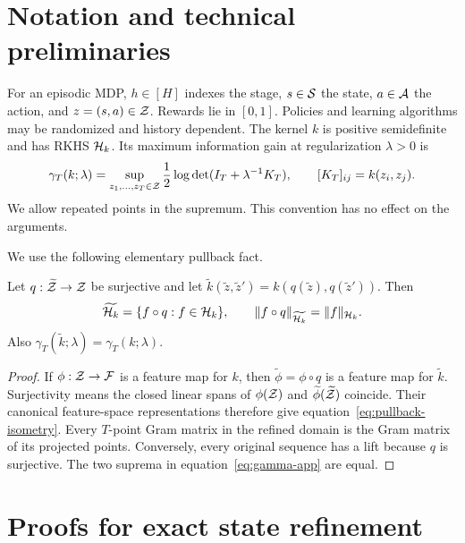 \section{Notation and technical preliminaries}
\label{app:prelim}

For an episodic MDP, $h\in[H]$ indexes the stage, $s\in\mathcal S$ the state,
$a\in\mathcal A$ the action, and $z=(s,a)\in\mathcal Z$. Rewards lie in $[0,1]$.
Policies and learning algorithms may be randomized and history dependent. The
kernel $k$ is positive semidefinite and has RKHS $\mathcal H_k$. Its maximum information
gain at regularization $\lambda>0$ is
\begin{equation}
 \gamma_T(k;\lambda)=
 \sup_{z_1,\ldots,z_T\in\mathcal Z}
 \frac12\log\det(I_T+\lambda^{-1}K_T),
 \qquad [K_T]_{ij}=k(z_i,z_j).
 \label{eq:gamma-app}
\end{equation}
We allow repeated points in the supremum. This convention has no effect on the
arguments.

We use the following elementary pullback fact.

\begin{lemma}
\label{lem:pullback}
Let $q:\widetilde{\mathcal Z}\to\mathcal Z$ be surjective and let
$\widetilde k(\tilde z,\tilde z')=k(q(\tilde z),q(\tilde z'))$. Then
\begin{equation}
 \widetilde{\mathcal H_k}=\{f\circ q:f\in\mathcal H_k\},
 \qquad \|f\circ q\|_{\widetilde{\mathcal H_k}}=\|f\|_{\mathcal H_k}.
 \label{eq:pullback-isometry}
\end{equation}
Also $\gamma_T(\widetilde k;\lambda)=\gamma_T(k;\lambda)$.
\end{lemma}

\begin{proof}
If $\phi:\mathcal Z\to\mathcal F$ is a feature map for $k$, then
$\widetilde\phi=\phi\circ q$ is a feature map for $\widetilde k$. Surjectivity
means the closed linear spans of $\phi(\mathcal Z)$ and
$\widetilde\phi(\widetilde{\mathcal Z})$ coincide. Their canonical feature-space
representations therefore give equation~\eqref{eq:pullback-isometry}. Every
$T$-point Gram matrix in the refined domain is the Gram matrix of its projected
points. Conversely, every original sequence has a lift because $q$ is surjective.
The two suprema in equation~\eqref{eq:gamma-app} are equal.
\end{proof}

\section{Proofs for exact state refinement}
\label{app:refinement}

